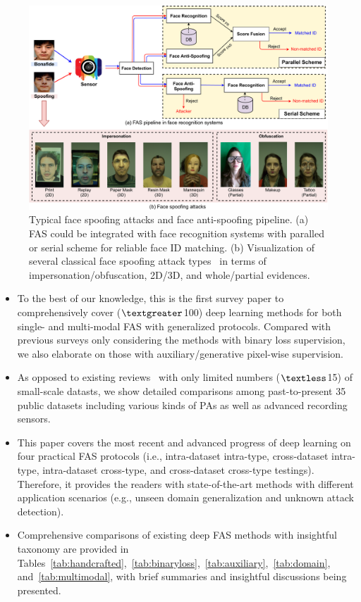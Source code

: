 \documentclass[10pt,journal,compsoc]{IEEEtran}
\begin{document}
\begin{figure}
\centering
\includegraphics[scale=0.4]{Figures/pipeline.pdf}
  \caption{ 
  Typical face spoofing attacks and face anti-spoofing pipeline. (a) FAS could be integrated with face recognition systems with paralled or serial scheme for reliable face ID matching. (b) Visualization of several classical face spoofing attack types~\cite{heusch2020deep} in terms of impersonation/obfuscation, 2D/3D, and whole/partial evidences.
  }
\label{fig:pipeline}
\end{figure}




\begin{itemize}
    
    \item To the best of our knowledge, this is the first survey paper to comprehensively cover ($\textgreater$100) deep learning methods for both single- and multi-modal FAS with generalized protocols. Compared with previous surveys only considering the methods with binary loss supervision, we also elaborate on those with auxiliary/generative pixel-wise supervision. 
    
    \item  As opposed to existing reviews~\cite{pereira2020rise,jia2020survey,el2020deep} with only limited numbers ($\textless$15) of small-scale datasts, we show detailed comparisons among past-to-present 35 public datasets including various kinds of PAs as well as advanced recording sensors.
    
   \item  This paper covers the most recent and advanced progress of deep learning on four practical FAS protocols (i.e., intra-dataset intra-type, cross-dataset intra-type, intra-dataset cross-type, and cross-dataset cross-type testings). Therefore, it provides the readers with state-of-the-art methods with different application scenarios (e.g., unseen domain generalization and unknown attack detection).
   
   \item  Comprehensive comparisons of existing deep FAS methods with insightful taxonomy are provided in Tables~\ref{tab:handcrafted},~\ref{tab:binaryloss},~\ref{tab:auxiliary},~\ref{tab:domain}, and~\ref{tab:multimodal}, with brief summaries and insightful discussions being presented.
 
\end{itemize}
\end{document}
